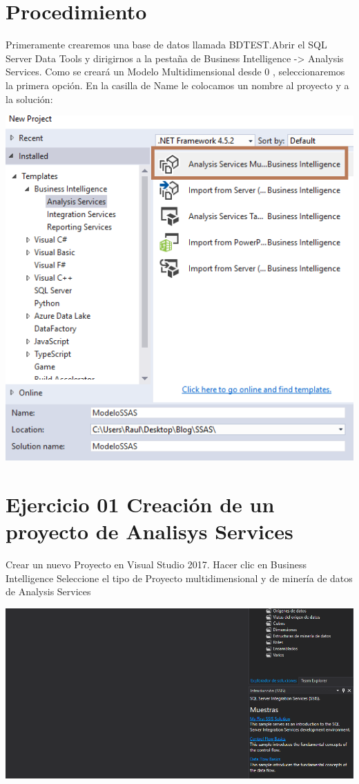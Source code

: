 \section{Procedimiento} 

Primeramente crearemos una base de datos llamada BDTEST.Abrir el SQL Server Data Tools y dirigirnos a la pestaña de Business Intelligence -> Analysis Services. Como se creará un Modelo Multidimensional desde 0 , seleccionaremos la primera opción. En la casilla de Name le colocamos un nombre al proyecto y a la solución:
	\begin{center}
	\includegraphics[width=0.5\columnwidth]{images/task1/1}
	\end{center}	

\section{Ejercicio 01 Creación de un proyecto de Analisys Services}

Crear un nuevo Proyecto en Visual Studio 2017.  Hacer clic en Business Intelligence
Seleccione el tipo de Proyecto multidimensional y de minería de datos de Analysis Services
	\begin{center}
	\includegraphics[width=0.5\columnwidth]{images/task1/2}
	\end{center}	

